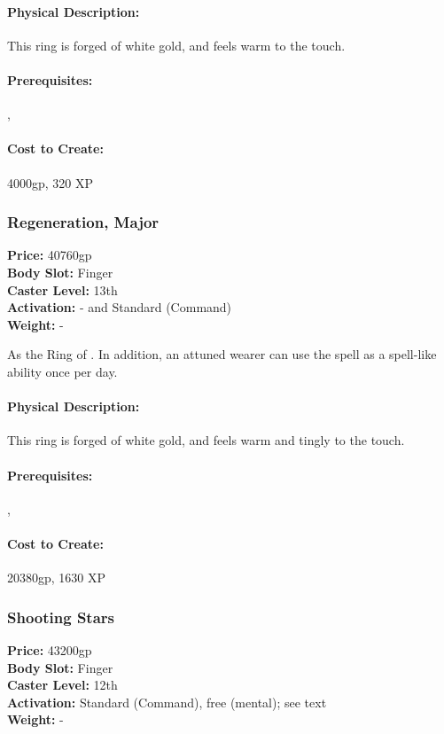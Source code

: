 \paragraph{Physical Description:} This ring is forged of white gold, and feels warm to the touch.

\paragraph{Prerequisites:} , 

\paragraph{Cost to Create:} 4000gp, 320 XP

\subsubsection{Regeneration, Major}
\label{Item:RegenerationMajor}
   \textbf{Price:} 40760gp
\\ \textbf{Body Slot:} Finger
\\ \textbf{Caster Level:} 13th
\\ \textbf{Activation:} - and Standard (Command)
\\ \textbf{Weight:} -

As the Ring of . In addition, an attuned wearer can use the  spell as a spell-like ability once per day.

\paragraph{Physical Description:} This ring is forged of white gold, and feels warm and tingly to the touch.

\paragraph{Prerequisites:} , 

\paragraph{Cost to Create:} 20380gp, 1630 XP
\subsubsection{Shooting Stars}
\label{Item:ShootingStars}
   \textbf{Price:} 43200gp
\\ \textbf{Body Slot:} Finger
\\ \textbf{Caster Level:} 12th
\\ \textbf{Activation:} Standard (Command), free (mental); see text
\\ \textbf{Weight:} -

